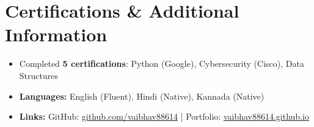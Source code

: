\documentclass[letterpaper,11pt]{article}
\newcommand{\resumeItem}[1]{\item\small{{#1 \vspace{-2pt}}}}
\newcommand{\resumeItemListStart}{\begin{itemize}}
\newcommand{\resumeItemListEnd}{\end{itemize}\vspace{-6pt}}
\begin{document}
\section{Certifications \& Additional Information}
\resumeItemListStart
  \setlength{\itemsep}{0pt}
    \resumeItem{Completed \textbf{5 certifications}: Python (Google), Cybersecurity (Cisco), Data Structures}
    \resumeItem{\textbf{Languages:} English (Fluent), Hindi (Native), Kannada (Native)}
    \resumeItem{\textbf{Links:} GitHub: \href{https://github.com/vaibhav88614}{github.com/vaibhav88614} | Portfolio: \href{https://vaibhav88614.github.io/}{vaibhav88614.github.io}}
\resumeItemListEnd
\end{document}
